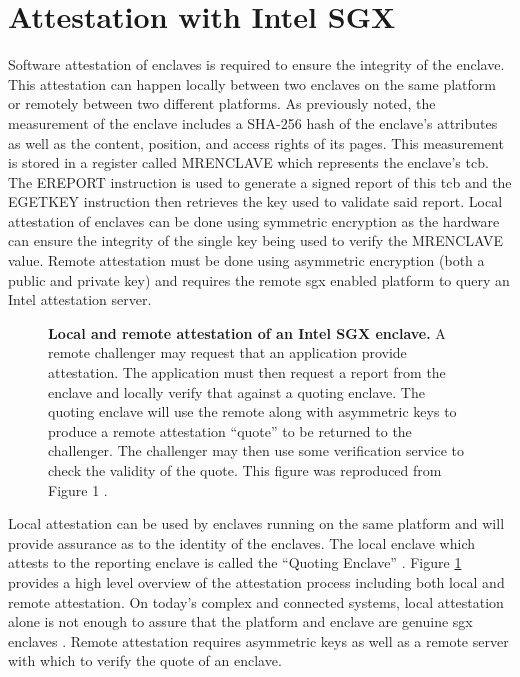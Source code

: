 \section{Attestation with Intel SGX}
Software attestation of enclaves is required to ensure the integrity of the enclave. This attestation can happen locally between two enclaves on the same platform or remotely between two different platforms. As previously noted, the measurement of the enclave includes a SHA-256 hash of the enclave's attributes as well as the content, position, and access rights of its pages. This measurement is stored in a register called MRENCLAVE which represents the enclave's \gls{tcb}. The EREPORT instruction is used to generate a signed report of this \gls{tcb} and the EGETKEY instruction then retrieves the key used to validate said report. Local attestation of enclaves can be done using symmetric encryption as the hardware can ensure the integrity of the single key being used to verify the MRENCLAVE value. Remote attestation must be done using asymmetric encryption (both a public and private key) and requires the remote \gls{sgx} enabled platform to query an Intel attestation server.

\begin{figure}[ht]
\centering

\caption[Intel SGX Attestation]{\textbf{Local and remote attestation of an Intel SGX enclave.} A remote challenger may request that an application provide attestation. The application must then request a report from the enclave and locally verify that against a quoting enclave. The quoting enclave will use the remote along with asymmetric keys to produce a remote attestation ``quote'' to be returned to the challenger. The challenger may then use some verification service to check the validity of the quote. This figure was reproduced from Figure 1 \cite{johnson2016intel}.}
\label{fig:sgx-attest}
\end{figure}

Local attestation can be used by enclaves running on the same platform and will provide assurance as to the identity of the enclaves. The local enclave which attests to the reporting enclave is called the ``Quoting Enclave'' \cite{johnson2016intel}. Figure \ref{fig:sgx-attest} provides a high level overview of the attestation process including both local and remote attestation. On today's complex and connected systems, local attestation alone is not enough to assure that the platform and enclave are genuine \gls{sgx} enclaves \cite{knauth2018integrating}. Remote attestation requires asymmetric keys as well as a remote server with which to verify the quote of an enclave.

